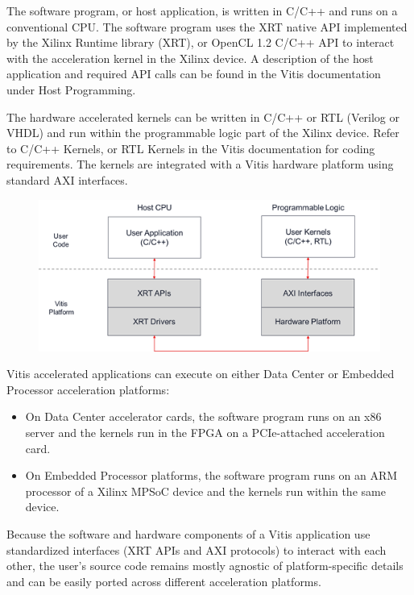 \par The software program, or host application, is written in C/C++ and runs on a conventional CPU. The software program uses the XRT native API implemented by the Xilinx Runtime library (XRT), or OpenCL 1.2 C/C++ API to interact with the acceleration kernel in the Xilinx device. A description of the host application and required API calls can be found in the Vitis documentation under Host Programming.

\par The hardware accelerated kernels can be written in C/C++ or RTL (Verilog or VHDL) and run within the programmable logic part of the Xilinx device. Refer to C/C++ Kernels, or RTL Kernels in the Vitis documentation for coding requirements. The kernels are integrated with a Vitis hardware platform using standard AXI interfaces.

\begin{figure}[H]
	\begin{center}
		\includegraphics[width=5in]{images/part1_execution_model.png}
		\label{part1_execution_model}
	\end{center}
\end{figure}

Vitis accelerated applications can execute on either Data Center or Embedded Processor acceleration platforms:

\begin{itemize}
    \item On Data Center accelerator cards, the software program runs on an x86 server and the kernels run in the FPGA on a PCIe-attached acceleration card.
    \item On Embedded Processor platforms, the software program runs on an ARM processor of a Xilinx MPSoC device and the kernels run within the same device.
\end{itemize}

Because the software and hardware components of a Vitis application use standardized interfaces (XRT APIs and AXI protocols) to interact with each other, the user's source code remains mostly agnostic of platform-specific details and can be easily ported across different acceleration platforms.

